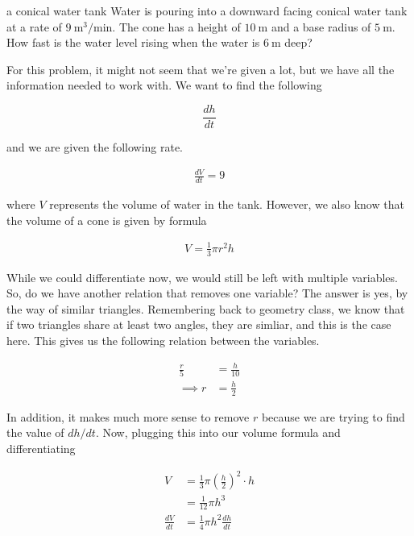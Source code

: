 \begin{examplebreak}{a conical water tank}
    Water is pouring into a downward facing conical water tank at a rate of \( \SI{9}{\meter^3\per\minute} \). The cone has a height of \( \SI{10}{\meter} \) and a base radius of \( \SI{5}{\meter} \). How fast is the water level rising when the water is \( \SI{6}{\meter} \) deep?

    \begin{figure}[H]
        \centering
        
    \end{figure}

    \vspace{0.3cm}

    For this problem, it might not seem that we're given a lot, but we have all the information needed to work with. We want to find the following

    \[
        \frac{dh}{dt}
    \]

    and we are given the following rate.

    \begin{align*}
        \frac{dV}{dt} = 9
    \end{align*}

    where \( V \) represents the volume of water in the tank. However, we also know that the volume of a cone is given by formula

    \begin{align*}
        V = \frac{1}{3} \pi r^2 h
    \end{align*}

    While we could differentiate now, we would still be left with multiple variables. So, do we have another relation that removes one variable? The answer is yes, by the way of similar triangles. Remembering back to geometry class, we know that if two triangles share at least two angles, they are simliar, and this is the case here. This gives us the following relation between the variables.

    \begin{align*}
        \frac{r}{5} &= \frac{h}{10} \\
        \implies r &= \frac{h}{2}
    \end{align*}

    In addition, it makes much more sense to remove \( r \) because we are trying to find the value of \( dh/dt \). Now, plugging this into our volume formula and differentiating

    \begin{align*}
        V &= \frac{1}{3} \pi \left( \frac{h}{2} \right)^2 \cdot h \\
          &= \frac{1}{12} \pi h^3 \\
        \frac{dV}{dt} &= \frac{1}{4} \pi h^2 \frac{dh}{dt}
    \end{align*}


\end{examplebreak}
